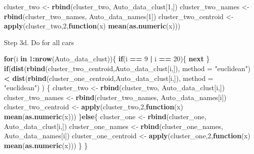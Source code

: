 \documentclass[11pt,]{article}
\newenvironment{Shaded}{\begin{snugshade}}{\end{snugshade}}
\newcommand{\ControlFlowTok}[1]{\textcolor[rgb]{0.13,0.29,0.53}{\textbf{#1}}}
\newcommand{\DataTypeTok}[1]{\textcolor[rgb]{0.13,0.29,0.53}{#1}}
\newcommand{\DecValTok}[1]{\textcolor[rgb]{0.00,0.00,0.81}{#1}}
\newcommand{\KeywordTok}[1]{\textcolor[rgb]{0.13,0.29,0.53}{\textbf{#1}}}
\newcommand{\NormalTok}[1]{#1}
\newcommand{\OperatorTok}[1]{\textcolor[rgb]{0.81,0.36,0.00}{\textbf{#1}}}
\newcommand{\StringTok}[1]{\textcolor[rgb]{0.31,0.60,0.02}{#1}}
\begin{document}
\begin{Shaded}
\begin{Highlighting}[]
\NormalTok{cluster_two <-}\StringTok{ }\KeywordTok{rbind}\NormalTok{(cluster_two, Auto_data_clust[}\DecValTok{1}\NormalTok{,])}
\NormalTok{cluster_two_names <-}\StringTok{ }\KeywordTok{rbind}\NormalTok{(cluster_two_names, Auto_data_names[}\DecValTok{1}\NormalTok{])}
\NormalTok{cluster_two_centroid <-}\StringTok{ }\KeywordTok{apply}\NormalTok{(cluster_two,}\DecValTok{2}\NormalTok{,}\ControlFlowTok{function}\NormalTok{(x) }\KeywordTok{mean}\NormalTok{(}\KeywordTok{as.numeric}\NormalTok{(x)))}
\end{Highlighting}
\end{Shaded}

Step 3d. Do for all cars

\begin{Shaded}
\begin{Highlighting}[]
\ControlFlowTok{for}\NormalTok{(i }\ControlFlowTok{in} \DecValTok{1}\OperatorTok{:}\KeywordTok{nrow}\NormalTok{(Auto_data_clust))\{}
  \ControlFlowTok{if}\NormalTok{(i }\OperatorTok{==}\StringTok{ }\DecValTok{9} \OperatorTok{|}\StringTok{ }\NormalTok{i }\OperatorTok{==}\StringTok{ }\DecValTok{20}\NormalTok{)\{}
    \ControlFlowTok{next}
\NormalTok{  \}}
  \ControlFlowTok{if}\NormalTok{(}\KeywordTok{dist}\NormalTok{(}\KeywordTok{rbind}\NormalTok{(cluster_two_centroid,Auto_data_clust[i,]), }\DataTypeTok{method =} \StringTok{"euclidean"}\NormalTok{) }\OperatorTok{<}\StringTok{ }\KeywordTok{dist}\NormalTok{(}\KeywordTok{rbind}\NormalTok{(cluster_one_centroid,Auto_data_clust[i,]), }\DataTypeTok{method =} \StringTok{"euclidean"}\NormalTok{) ) \{}
\NormalTok{    cluster_two <-}\StringTok{ }\KeywordTok{rbind}\NormalTok{(cluster_two, Auto_data_clust[i,])}
\NormalTok{    cluster_two_names <-}\StringTok{ }\KeywordTok{rbind}\NormalTok{(cluster_two_names, Auto_data_names[i])}
\NormalTok{    cluster_two_centroid <-}\StringTok{ }\KeywordTok{apply}\NormalTok{(cluster_two,}\DecValTok{2}\NormalTok{,}\ControlFlowTok{function}\NormalTok{(x) }\KeywordTok{mean}\NormalTok{(}\KeywordTok{as.numeric}\NormalTok{(x)))}
\NormalTok{  \}}\ControlFlowTok{else}\NormalTok{\{}
\NormalTok{    cluster_one <-}\StringTok{ }\KeywordTok{rbind}\NormalTok{(cluster_one, Auto_data_clust[i,])}
\NormalTok{    cluster_one_names <-}\StringTok{ }\KeywordTok{rbind}\NormalTok{(cluster_one_names, Auto_data_names[i])}
\NormalTok{    cluster_one_centroid <-}\StringTok{ }\KeywordTok{apply}\NormalTok{(cluster_one,}\DecValTok{2}\NormalTok{,}\ControlFlowTok{function}\NormalTok{(x) }\KeywordTok{mean}\NormalTok{(}\KeywordTok{as.numeric}\NormalTok{(x)))}
\NormalTok{  \}}
\NormalTok{\}}
\end{Highlighting}
\end{Shaded}
\end{document}
